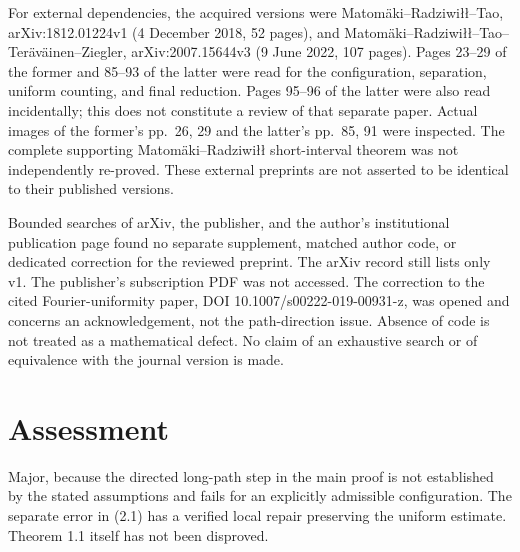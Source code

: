 \documentclass[10pt]{article}
\begin{document}
For external dependencies, the acquired versions were Matomäki–Radziwiłł–Tao, arXiv:1812.01224v1 (4 December 2018, 52 pages), and Matomäki–Radziwiłł–Tao–Teräväinen–Ziegler, arXiv:2007.15644v3 (9 June 2022, 107 pages). Pages 23–29 of the former and 85–93 of the latter were read for the configuration, separation, uniform counting, and final reduction. Pages 95–96 of the latter were also read incidentally; this does not constitute a review of that separate paper. Actual images of the former’s pp. 26, 29 and the latter’s pp. 85, 91 were inspected. The complete supporting Matomäki–Radziwiłł short-interval theorem was not independently re-proved. These external preprints are not asserted to be identical to their published versions.\par
Bounded searches of arXiv, the publisher, and the author’s institutional publication page found no separate supplement, matched author code, or dedicated correction for the reviewed preprint. The arXiv record still lists only v1. The publisher’s subscription PDF was not accessed. The correction to the cited Fourier-uniformity paper, DOI 10.1007/s00222-019-00931-z, was opened and concerns an acknowledgement, not the path-direction issue. Absence of code is not treated as a mathematical defect. No claim of an exhaustive search or of equivalence with the journal version is made.\par
\section*{Assessment}
Major, because the directed long-path step in the main proof is not established by the stated assumptions and fails for an explicitly admissible configuration. The separate error in (2.1) has a verified local repair preserving the uniform estimate. Theorem 1.1 itself has not been disproved.\par
\end{document}
